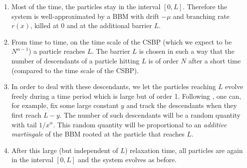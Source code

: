 \documentclass[11pt]{article}
\theoremstyle{plain}
\begin{document}
\begin{enumerate}
\item Most of the time, the particles stay in the interval $[0,L]$. Therefore the system is well-approximated by a BBM with drift $-\mu$ and branching rate $r(x)$, killed at $0$ and at the additional barrier $L$.
\item From time to time, on the time scale of the CSBP (which we expect to be $N^{\alpha-1}$) a particle reaches $L$. The barrier $L$ is chosen in such a way that the number of descendants of a particle hitting $L$ is of order $N$ after a short time (compared to the time scale of the CSBP). 
\item In order to deal with these descendants, we let the particles reaching $L$ evolve freely during a time period which is large but of order 1. Following \cite{Berestycki2010}, one can, for example, fix some large constant $y$ and track the descendants when they first reach $L-y$. The number of such descendants will be a random quantity with tail $1/x^\alpha$. This random quantity will be proportional to an \emph{additive martingale} of the BBM rooted at the particle that reaches $L$.
\item After this large (but independent of $L$) relaxation time, all particles are again in the interval $[0,L]$ and the system  evolves as before.
\end{enumerate}
\end{document}
